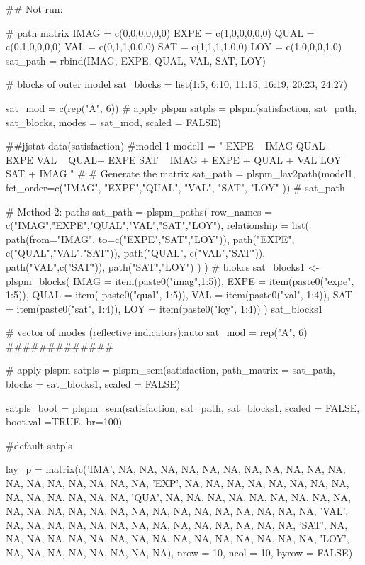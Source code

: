 \documentclass[a4paper]{book}
\begin{document}
%
\begin{Examples}
\begin{ExampleCode}
## Not run: 

# path matrix
IMAG = c(0,0,0,0,0,0)
EXPE = c(1,0,0,0,0,0)
QUAL = c(0,1,0,0,0,0)
VAL = c(0,1,1,0,0,0)
SAT = c(1,1,1,1,0,0)
LOY = c(1,0,0,0,1,0)
sat_path = rbind(IMAG, EXPE, QUAL, VAL, SAT, LOY)

# blocks of outer model
sat_blocks = list(1:5, 6:10, 11:15, 16:19, 20:23, 24:27)

sat_mod = c(rep("A", 6))
# apply plspm
satpls = plspm(satisfaction, sat_path, sat_blocks, modes = sat_mod,
               scaled = FALSE)


 ##jjstat
data(satisfaction)
#model 1
model1 = "
EXPE ~ IMAG
QUAL ~ EXPE
VAL ~  QUAL+ EXPE
SAT ~ IMAG + EXPE + QUAL + VAL
LOY ~ SAT + IMAG
"
# # Generate the matrix
sat_path = plspm_lav2path(model1,
                          fct_order=c("IMAG", "EXPE","QUAL", "VAL", "SAT", "LOY" ))
# sat_path

# Method 2: paths
sat_path = plspm_paths(
  row_names = c("IMAG","EXPE","QUAL","VAL","SAT","LOY"),
  relationship = list(
    path(from="IMAG", to=c("EXPE","SAT","LOY")),
    path("EXPE", c("QUAL","VAL","SAT")),
    path("QUAL", c("VAL","SAT")),
    path("VAL",c("SAT")),
    path("SAT","LOY")
  )
)
# blokcs
sat_blocks1 <- plspm_blocks(
  IMAG = item(paste0("imag",1:5)),
  EXPE = item(paste0("expe", 1:5)),
  QUAL = item( paste0("qual", 1:5)),
  VAL = item(paste0("val", 1:4)),
  SAT = item(paste0("sat", 1:4)),
  LOY = item(paste0("loy", 1:4))
)
sat_blocks1

# vector of modes (reflective indicators):auto
sat_mod = rep("A", 6)
#############

# apply plspm
satpls = plspm_sem(satisfaction,
                   path_matrix = sat_path,
                   blocks = sat_blocks1,
                   scaled = FALSE)

satpls_boot = plspm_sem(satisfaction, sat_path, sat_blocks1, scaled = FALSE,
                        boot.val =TRUE, br=100)

#default
satpls %



lay_p = matrix(c('IMA', NA, NA, NA, NA, NA, NA,
 NA, NA, NA, NA, NA, NA, NA, NA, NA, NA, NA, NA,
 'EXP', NA, NA, NA, NA, NA, NA, NA, NA, NA, NA,
 NA, NA, NA, NA, 'QUA', NA, NA, NA, NA, NA, NA,
 NA, NA, NA, NA, NA, NA, NA, NA, NA, NA, NA, NA,
 NA, NA, NA, NA, NA, NA, 'VAL', NA, NA, NA, NA,
 NA, NA, NA, NA, NA, NA, NA, NA, NA, NA, 'SAT',
 NA, NA, NA, NA, NA, NA, NA, NA, NA, NA, NA, NA,
 NA, NA, NA, NA, 'LOY', NA, NA, NA, NA, NA, NA, NA, NA),
 nrow = 10, ncol = 10, byrow = FALSE)


\end{ExampleCode}
\end{Examples}
\end{document}
